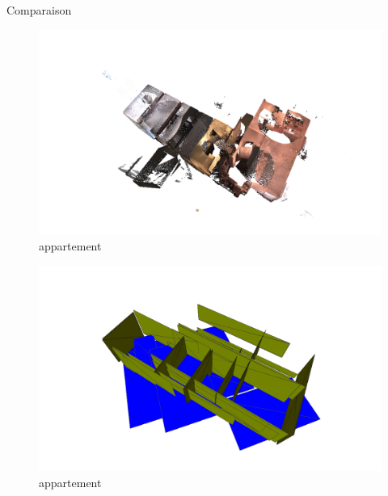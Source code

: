 \documentclass[11pt]{beamer}
\begin{document}
\begin{frame}{Comparaison}
\begin{multicols}{2}
\begin{figure}[hbtp]
\centering
\includegraphics[width=1.3\columnwidth]{appart01.png}
\caption{appartement}
\end{figure}

\columnbreak
\begin{figure}[hbtp]
\centering
\includegraphics[width=1.3\columnwidth]{appart04.png}
\caption{appartement}
\end{figure}

\end{multicols}
\end{frame}
\end{document}
